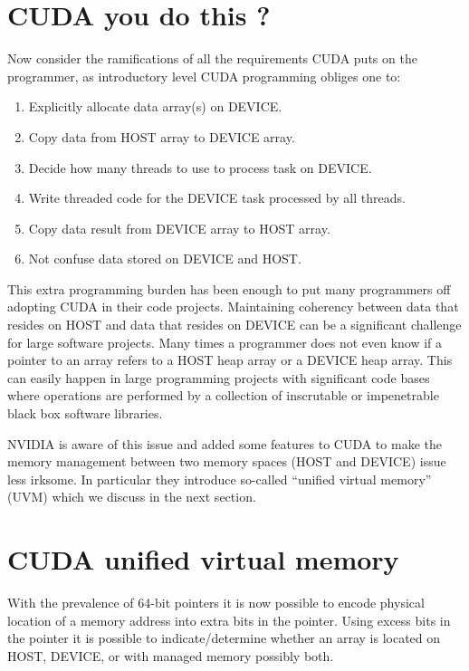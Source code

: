 \section{CUDA you do this ?}

Now consider the ramifications of all the requirements CUDA puts on the programmer, as introductory level CUDA programming obliges one to:

\begin{enumerate}
    \item Explicitly allocate data array(s) on DEVICE.
    \item Copy data from HOST array to DEVICE array.
    \item Decide how many threads to use to process task on DEVICE.
    \item Write threaded code for the DEVICE task processed by all threads.
    \item Copy data result from DEVICE array to HOST array.
    \item Not confuse data stored on DEVICE and HOST.
\end{enumerate}

This extra programming burden has been enough to put many programmers off adopting CUDA in their code projects. Maintaining coherency between data that resides on HOST and data that resides on DEVICE can be a significant challenge for large software projects. Many times a programmer does not even know if a pointer to an array refers to a HOST heap array or a DEVICE heap array. This can easily happen in large programming projects with significant code bases where operations are performed by a collection of inscrutable or impenetrable black box software libraries. 

NVIDIA is aware of this issue and added some features to CUDA to make the memory management between two memory spaces (HOST and DEVICE) issue less irksome. In particular they introduce so-called ``unified virtual memory'' (UVM) which we discuss in the next section. 

\section{CUDA unified virtual memory}

With the prevalence of 64-bit pointers it is now possible to encode physical location of a memory address into extra bits in the pointer. Using excess bits in the pointer it is possible to indicate/determine whether an array is located on HOST, DEVICE, or with managed memory possibly both. 


